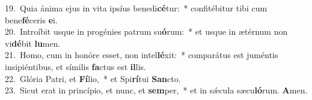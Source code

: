 {19.~}Quia ánima ejus in vita ipsíus benedi\textbf{cé}tur:~* confitébitur tibi cum bene\textbf{fé}ceris \textbf{e}i.\\
{20.~}Introíbit usque in progénies patrum su\textbf{ó}rum:~* et usque in ætérnum non vi\textbf{dé}bit \textbf{lu}men.\\
{21.~}Homo, cum in honóre esset, non intel\textbf{lé}xit:~* comparátus est juméntis insipiéntibus, et símilis \textbf{fa}ctus est \textbf{il}lis.\\
{22.~}Glória Patri, et \textbf{Fí}lio,~* et Spi\textbf{rí}tui \textbf{San}cto.\\
{23.~}Sicut erat in princípio, et nunc, et \textbf{sem}per,~* et in sǽcula sæcu\textbf{ló}rum. \textbf{A}men.\\
